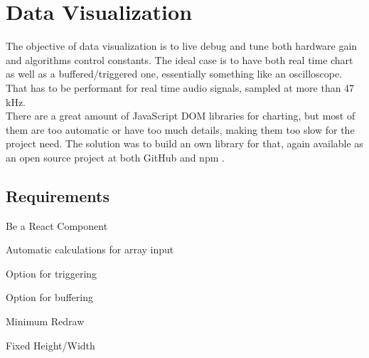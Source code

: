 \section{Data Visualization}
\label{data-visualization}

The objective of data visualization is to live debug and tune both hardware gain
and algorithms control constants. The ideal case is to have both real time chart
as well as a buffered/triggered one, essentially something like an oscilloscope.
That has to be performant for real time audio signals, sampled at more than 47 kHz.\\
There are a great amount of JavaScript DOM libraries for charting, but most of
them are too automatic or have too much details, making them too slow for the project need.
The solution was to build an own library for that, again available as an open source
project at both GitHub and npm \cite{react-plotter}.

\subsection{Requirements}
\label{data-visualization-requirements}
\begin{itemlist}
  \item Be a React Component
  \item Automatic calculations for array input
  \item Option for triggering
  \item Option for buffering
  \item Minimum Redraw
  \item Fixed Height/Width
\end{itemlist}

